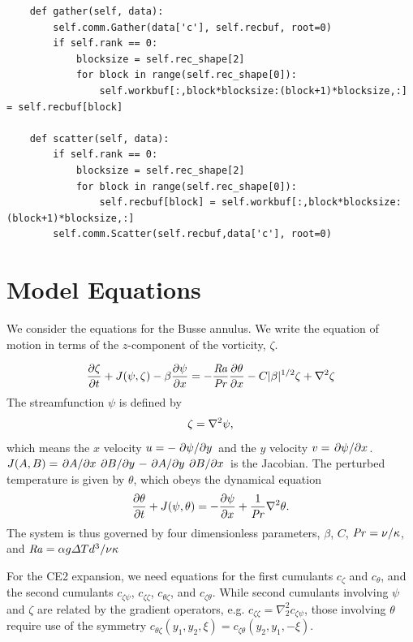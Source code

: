\documentclass{jfm}
\newcommand{\cz}{c_{\zeta}}
\newcommand{\ct}{c_{\theta}}
\newcommand{\czs}{c_{\zeta \psi}}
\newcommand{\czz}{c_{\zeta \zeta}}
\newcommand{\ctz}{c_{\theta \zeta}}
\newcommand{\czt}{c_{\zeta \theta}}
\newcommand{\Ray}{\mbox{\textit{Ra}}}  %
\begin{document}
\begin{verbatim}
    def gather(self, data):
        self.comm.Gather(data['c'], self.recbuf, root=0)
        if self.rank == 0:
            blocksize = self.rec_shape[2]
            for block in range(self.rec_shape[0]):
                self.workbuf[:,block*blocksize:(block+1)*blocksize,:] = self.recbuf[block]

    def scatter(self, data):
        if self.rank == 0:
            blocksize = self.rec_shape[2]
            for block in range(self.rec_shape[0]):
                self.recbuf[block] = self.workbuf[:,block*blocksize:(block+1)*blocksize,:]
        self.comm.Scatter(self.recbuf,data['c'], root=0)

\end{verbatim}


\section{Model Equations}
\label{sec:model-eqations}

We consider the equations for the Busse annulus.
We write the equation of motion in terms of the $z$-component of the vorticity, $\zeta$.

\begin{equation}
  \label{eq:zeta_eom}
  \pdv{\zeta}{t} + J(\psi, \zeta) - \beta \pdv{\psi}{x} = -\frac{\Ray}{\Pran} \pdv{\theta}{x} -C |\beta|^{1/2} \zeta + \laplacian{\zeta}
\end{equation}
The streamfunction $\psi$ is defined by
\begin{equation}
  \label{eq:zeta_def}
  \zeta = \laplacian{\psi},
\end{equation}
which means the $x$ velocity $u = -\pdv*{\psi}{y}$ and the $y$ velocity $v = \pdv*{\psi}{x}$. $J(A, B) = \pdv*{A}{x}\pdv*{B}{y} - \pdv*{A}{y}\pdv*{B}{x}$ is the Jacobian. 
The perturbed temperature is given by $\theta$, which obeys the dynamical equation
%
\begin{equation}
  \label{eq:theta}
  \pdv{\theta}{t} + J(\psi, \theta) = -\pdv{\psi}{x} + \frac{1}{\mbox{\textit{Pr}}} \nabla^2 \theta.
\end{equation}
The system is thus governed by four dimensionless parameters, $\beta$, $C$, $\mbox{\textit{Pr}} = \nu/
\kappa$, and $\Ray = \alpha g \Delta T d^3/\nu \kappa$

For the CE2 expansion, we need equations for the first cumulants $\cz$ and $\ct$, and the second cumulants $\czs$, $\czz$, $\ctz$, and $\czt$. 
While second cumulants involving $\psi$ and $\zeta$ are related by the gradient operators, e.g. $\czz = \nabla_2^2 \czs$, those involving $\theta$ require use of the symmetry $\ctz(y_1, y_2, \xi) = \czt(y_2, y_1, -\xi)$.
\end{document}
